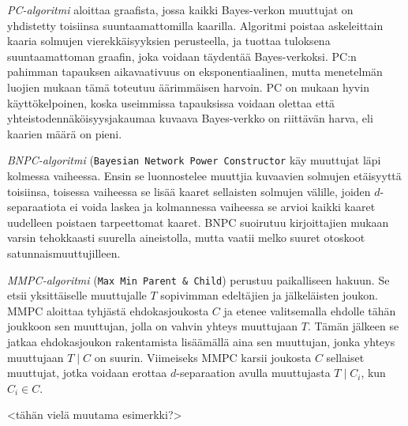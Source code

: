 \emph{PC-algoritmi} \citep{spirtes_causation_1993, tsagris_bayesian_2019} aloittaa graafista, jossa kaikki Bayes-verkon muuttujat on yhdistetty toisiinsa suuntaamattomilla kaarilla. Algoritmi poistaa askeleittain kaaria solmujen vierekkäisyyksien perusteella, ja tuottaa tuloksena suuntaamattoman graafin, joka voidaan täydentää Bayes-verkoksi. PC:n pahimman tapauksen aikavaativuus on eksponentiaalinen, mutta menetelmän luojien mukaan tämä toteutuu äärimmäisen harvoin. PC on \citet{scanagatta_survey_2019} mukaan hyvin käyttökelpoinen, koska useimmissa tapauksissa voidaan olettaa että yhteistodennäköisyysjakaumaa kuvaava Bayes-verkko on riittävän harva, eli kaarien määrä on pieni.

\emph{BNPC-algoritmi} (\texttt{Bayesian Network Power Constructor}  \citep{natori_constraint-based_2015} käy muuttujat läpi kolmessa vaiheessa. Ensin se
luonnostelee muuttjia kuvaavien solmujen etäisyyttä toisiinsa, toisessa vaiheessa se lisää
kaaret sellaisten solmujen välille, joiden $d$-separaatiota ei voida laskea ja kolmannessa
vaiheessa se arvioi kaikki kaaret uudelleen poistaen tarpeettomat kaaret. BNPC suoirutuu
kirjoittajien mukaan varsin tehokkaasti suurella aineistolla, mutta vaatii melko suuret
otoskoot satunnaismuuttujilleen.

\emph{MMPC-algoritmi} (\texttt{Max Min Parent \& Child}) \citep{tsamardinos_time_2003} perustuu paikalliseen hakuun. Se etsii yksittäiselle muuttujalle $T$ sopivimman edeltäjien ja jälkeläisten joukon. MMPC aloittaa tyhjästä ehdokasjoukosta $C$ ja etenee valitsemalla ehdolle tähän joukkoon sen muuttujan, jolla on vahvin yhteys muuttujaan $T$. Tämän jälkeen se jatkaa ehdokasjoukon rakentamista lisäämällä aina sen muuttujan, jonka yhteys muuttujaan $T \mid C$ on suurin. Viimeiseks MMPC karsii joukosta $C$ sellaiset muuttujat, jotka voidaan erottaa $d$-separaation avulla muuttujasta $T \mid C_i$, kun $C_i \in C$.  


<tähän vielä muutama esimerkki?>
